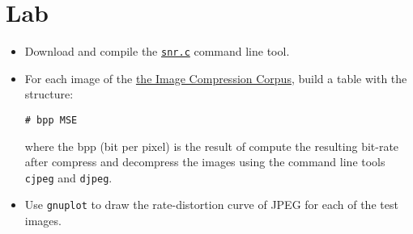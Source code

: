 \section{Lab}
\begin{itemize}
\item Download and compile the
  \href{http://www.ace.ual.es/~vruiz/docencia/doctorado/snr.c}{\texttt{snr.c}}
  command line tool.
\item For each image of the
  \href{http://www.ace.ual.es/~vruiz/images/}{the Image Compression
    Corpus}, build a table with the structure:
\begin{verbatim}
# bpp MSE
\end{verbatim}
where the bpp (bit per pixel) is the result of compute the resulting
bit-rate after compress and decompress the images using the command
line tools \texttt{cjpeg} and \texttt{djpeg}.
\item Use \texttt{gnuplot} to draw the rate-distortion curve of JPEG
  for each of the test images.
\end{itemize}


\begin{comment}
\item En el Apéndice \ref{ape:vids_make} se presenta un fichero
  \texttt{Makefile} que muestra cómo invocar al programa
  \textit{FFMPEG} (\texttt{ffmpeg.mplayerhq.hu}) para generar una
  secuencia de vídeo en formato M-JPEG.
\item Acceda al directorio \texttt{vids} que encontrará a la misma
  altura que este documento en el sistema de ficheros y visualice los
  vídeos \texttt{*MJPEG*}.
\item En Linux se recomienda usar el programa \textit{MPlayer}
  (\texttt{www.mplayerhq.hu}). Para lanzarlo ejecutar, por ejemplo:
\begin{verbatim}
mplayer -loop 0 -fs archivo_video
\end{verbatim}
\item  Bajo Windows se recomienda usar el programa \textit{VLC media
    player} (\texttt{www.videolan.org}).
\end{comment}



